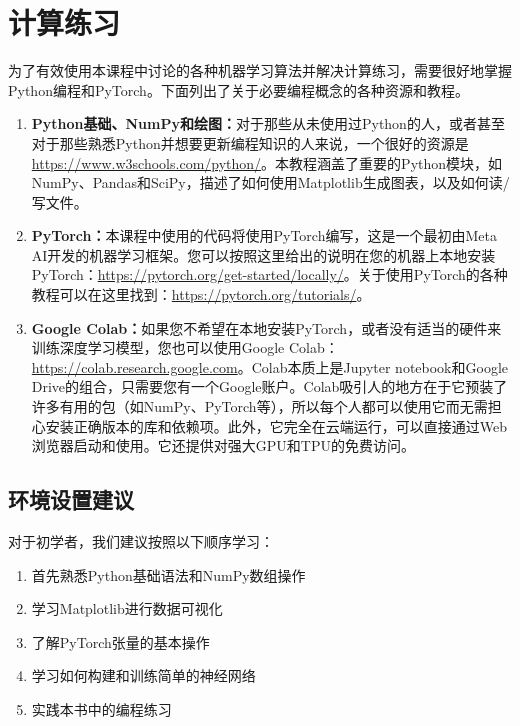 \section{计算练习}
\label{sec:computational_exercises}

为了有效使用本课程中讨论的各种机器学习算法并解决计算练习，需要很好地掌握Python编程和PyTorch。下面列出了关于必要编程概念的各种资源和教程。

\begin{enumerate}
\item \textbf{Python基础、NumPy和绘图：}对于那些从未使用过Python的人，或者甚至对于那些熟悉Python并想要更新编程知识的人来说，一个很好的资源是\url{https://www.w3schools.com/python/}。本教程涵盖了重要的Python模块，如NumPy、Pandas和SciPy，描述了如何使用Matplotlib生成图表，以及如何读/写文件。

\item \textbf{PyTorch：}本课程中使用的代码将使用PyTorch编写，这是一个最初由Meta AI开发的机器学习框架。您可以按照这里给出的说明在您的机器上本地安装PyTorch：\url{https://pytorch.org/get-started/locally/}。关于使用PyTorch的各种教程可以在这里找到：\url{https://pytorch.org/tutorials/}。

\item \textbf{Google Colab：}如果您不希望在本地安装PyTorch，或者没有适当的硬件来训练深度学习模型，您也可以使用Google Colab：\url{https://colab.research.google.com}。Colab本质上是Jupyter notebook和Google Drive的组合，只需要您有一个Google账户。Colab吸引人的地方在于它预装了许多有用的包（如NumPy、PyTorch等），所以每个人都可以使用它而无需担心安装正确版本的库和依赖项。此外，它完全在云端运行，可以直接通过Web浏览器启动和使用。它还提供对强大GPU和TPU的免费访问。
\end{enumerate}

\subsection{环境设置建议}
\label{subsec:environment_setup}

对于初学者，我们建议按照以下顺序学习：

\begin{enumerate}
\item 首先熟悉Python基础语法和NumPy数组操作
\item 学习Matplotlib进行数据可视化
\item 了解PyTorch张量的基本操作
\item 学习如何构建和训练简单的神经网络
\item 实践本书中的编程练习
\end{enumerate}

